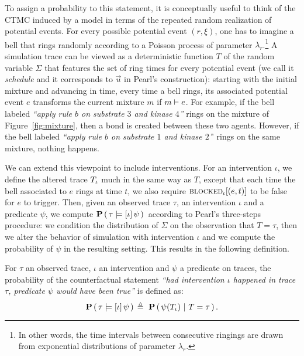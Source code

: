 To assign a probability to this statement, it is conceptually useful
to think of the CTMC induced by a model in terms of the repeated
random realization of potential events.  For every possible potential
event $(r, \xi)$, one has to imagine a bell that rings randomly
according to a Poisson process of parameter $\lambda_r$.\footnote{In
  other words, the time intervals between consecutive ringings are
  drawn from exponential distributions of parameter $\lambda_r$.}  A
simulation trace can be viewed as a deterministic function $T$ of the
random variable $\Sigma$ that features the set of ring times for every
potential event (we call it \emph{schedule} and it corresponds to
$\vec{u}$ in Pearl's construction): starting with the initial mixture
and advancing in time, every time a bell rings, its associated
potential event $e$ transforms the current mixture $m$ if
$m \vdash e$. For example, if the bell labeled \textit{``apply
  rule $b$ on substrate $3$ and kinase $4$''} rings on the mixture of
Figure~\ref{fig:mixture}, then a bond is created between these two
agents. However, if the bell labeled \textit{``apply rule $b$ on
  substrate $1$ and kinase $2$'}' rings on the same mixture, nothing
happens.

We can extend this viewpoint to include interventions. For an
intervention $\iota$, we define the altered trace ${T_\iota}{}$ much in
the same way as $T$, except that each time the bell associated to $e$
rings at time $t$, we also require ${\textsc{blocked}}_{\iota}[(e, t)]$ to be
false for $e$ to trigger. Then, given an observed trace $\tau$, an
intervention $\iota$ and a predicate $\psi$, we compute $\mathbf{P} \left(\, \tau \models [\iota] \, \psi{} \,\right){}$
according to Pearl's three-steps procedure: \ItAbduction{} we
condition the distribution of $\Sigma$ on the observation that
$T=\tau$, then \ItAction{} we alter the behavior of simulation with
intervention $\iota$ and \ItPrediction{} we compute the probability of
$\psi$ in the resulting setting. This results in the following
definition.

\begin{definition}\label{def:counterfactuals}
  For $\tau$ an observed trace, $\iota$ an intervention and $\psi$ a
  predicate on traces, the probability of the counterfactual statement
  \textit{``had intervention $\iota$ happened in trace $\tau$,
    predicate $\psi$ would have been true''} is defined as:
  \[ \PCFST{} \eqdef \ \ProbParen{\psi(\ATRAJ{}) \ |\ T = \tau}. \]
\end{definition}

